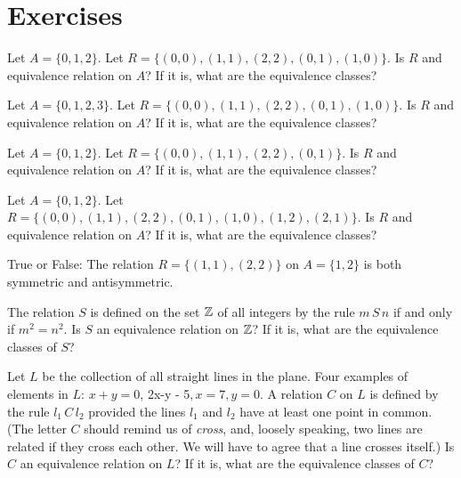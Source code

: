 \clearpage

\section{Exercises} 

\begin{exer}
Let $A = \{0,1,2\}$. Let $R = \{(0,0), (1,1), (2,2), (0,1), (1,0)\}$. 
Is $R$ and equivalence relation on $A$? If it is, what are the equivalence classes?
\end{exer}

\begin{exer}
Let $A = \{0,1,2,3\}$. Let $R = \{(0,0), (1,1), (2,2), (0,1), (1,0)\}$. 
Is $R$ and equivalence relation on $A$? If it is, what are the equivalence classes?
\end{exer}

\begin{exer}
Let $A = \{0,1,2\}$. Let $R = \{(0,0), (1,1), (2,2), (0,1)\}$. 
Is $R$ and equivalence relation on $A$? If it is, what are the equivalence classes?
\end{exer}

\begin{exer}
Let $A = \{0,1,2\}$. Let $R = \{(0,0), (1,1), (2,2), (0,1), (1,0),  (1,2), (2,1) \}$. 
Is $R$ and equivalence relation on $A$? If it is, what are the equivalence classes?
\end{exer}

\begin{exer}
True or False: The relation $R = \{ (1,1), (2,2)\}$ on $A = \{1,2\}$ is both symmetric and antisymmetric.
\end{exer}

\begin{exer}
The relation $S$ is defined on the set $\mathbb{Z}$ of all integers by the rule $m\,S\, n$ if and only if $m^{2} = n^{2}$.
Is $S$ an equivalence relation on $\mathbb{Z}$? If it is, what are the equivalence classes of $S$?
\end{exer}

\begin{exer}
Let $L$ be the collection of all straight lines in the plane. Four examples of elements in $L$: $x + y = 0$, 2x-y - 5$, x = 7, y = 0$.
A relation $C$ on $L$ is defined by the rule $l_{1}\, C \, l_{2}$ provided the lines $l_{1}$ and $l_{2}$ have at least one point in common.
(The letter $C$ should remind us of {\itshape cross}, and, loosely speaking, two lines are related if they cross each other. We will have to 
agree that a line crosses itself.) Is $C$ an equivalence relation on $L$? If it is, what are the equivalence classes of $C$?
\end{exer}

